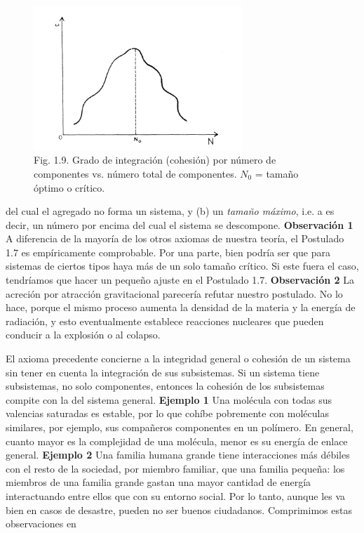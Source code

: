 {\fontsize{13}{15}\selectfont
\begin{figure}[h!]
    \centering
    \includegraphics[width=0.7\textwidth]{imagenes/figura1.9.png}
    \caption*{Fig. 1.9. Grado de integración (cohesión) por número de componentes vs. número total de componentes. \( N_0 \) = tamaño óptimo o crítico.}
\end{figure}
del cual el agregado no forma un sistema, y (b) un \textit{tamaño máximo}, i.e. a es decir, un número por encima del cual el sistema se descompone.
\textbf{Observación 1} A diferencia de la mayoría de los otros axiomas de nuestra teoría, el Postulado 1.7 es empíricamente comprobable. 
Por una parte, bien podría ser que para sistemas de ciertos tipos haya más de un solo tamaño crítico. Si este fuera el caso, tendríamos que hacer un pequeño ajuste en el Postulado 1.7.
 \textbf{Observación 2} La acreción por atracción gravitacional parecería refutar nuestro postulado. No lo hace, porque el mismo proceso aumenta la densidad de la materia y la energía de radiación, y esto eventualmente establece reacciones nucleares que pueden conducir a la explosión o al colapso. \par
El axioma precedente concierne a la integridad general o cohesión de un sistema sin tener en cuenta la integración de sus subsistemas. 
Si un sistema tiene subsistemas, no solo componentes, entonces la cohesión de los subsistemas compite con la del sistema general. \textbf{Ejemplo 1} Una molécula con todas sus valencias saturadas es estable, por lo que cohíbe pobremente con moléculas similares, por ejemplo, sus compañeros componentes en un polímero. 
En general, cuanto mayor es la complejidad de una molécula, menor es su energía de enlace general. \textbf{Ejemplo 2} Una familia humana grande tiene interacciones más débiles con el resto de la sociedad, por miembro familiar, que una familia pequeña: los miembros de una familia grande gastan una mayor cantidad de energía interactuando entre ellos que con su entorno social. 
Por lo tanto, aunque les va bien en casos de desastre, pueden no ser buenos ciudadanos.
Comprimimos estas observaciones en
}

